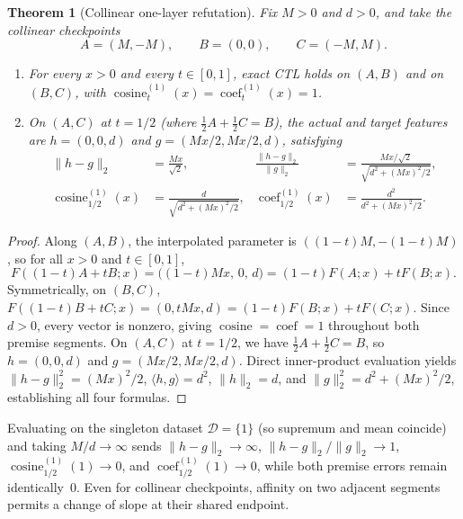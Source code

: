 \documentclass[11pt]{article}
\theoremstyle{plain}
\newtheorem{theorem}{Theorem}
\theoremstyle{definition}
\theoremstyle{remark}
\DeclareMathOperator{\cosine}{cosine}
\DeclareMathOperator{\coef}{coef}
\begin{document}
\begin{theorem}[Collinear one-layer refutation]\label{thm:one-layer}
Fix $M > 0$ and $d > 0$, and take the collinear checkpoints
\[
A = (M, -M), \qquad B = (0, 0), \qquad C = (-M, M).
\]
\begin{enumerate}[label=\textup{(\arabic*)},nosep]
\item For every $x > 0$ and every $t \in [0, 1]$, exact CTL holds on $(A, B)$ and on $(B, C)$, with $\cosine_t^{(1)}(x) = \coef_t^{(1)}(x) = 1$.
\item On $(A, C)$ at $t = 1/2$ (where $\frac{1}{2}A + \frac{1}{2}C = B$), the actual and target features are $h = (0, 0, d)$ and $g = (Mx/2, Mx/2, d)$, satisfying
\begin{align*}
\|h - g\|_2 &= \frac{Mx}{\sqrt{2}}, &
\frac{\|h - g\|_2}{\|g\|_2} &= \frac{Mx/\sqrt{2}}{\sqrt{d^2 + (Mx)^2/2}}, \\
\cosine_{1/2}^{(1)}(x) &= \frac{d}{\sqrt{d^2 + (Mx)^2/2}}, &
\coef_{1/2}^{(1)}(x) &= \frac{d^2}{d^2 + (Mx)^2/2}.
\end{align*}
\end{enumerate}
\end{theorem}

\begin{proof}
Along $(A, B)$, the interpolated parameter is $((1 - t)M, -(1 - t)M)$, so for all $x > 0$ and $t \in [0, 1]$,
\[
F((1 - t)A + tB; x) = \bigl((1 - t)Mx,\, 0,\, d\bigr) = (1 - t)F(A; x) + tF(B; x).
\]
Symmetrically, on $(B, C)$, $F((1 - t)B + tC; x) = (0, tMx, d) = (1 - t)F(B; x) + tF(C; x)$. Since $d > 0$, every vector is nonzero, giving $\cosine = \coef = 1$ throughout both premise segments. On $(A, C)$ at $t = 1/2$, we have $\frac{1}{2}A + \frac{1}{2}C = B$, so $h = (0, 0, d)$ and $g = (Mx/2, Mx/2, d)$. Direct inner-product evaluation yields $\|h - g\|_2^2 = (Mx)^2/2$, $\langle h, g \rangle = d^2$, $\|h\|_2 = d$, and $\|g\|_2^2 = d^2 + (Mx)^2/2$, establishing all four formulas.
\end{proof}

Evaluating on the singleton dataset $\mathcal{D} = \{1\}$ (so supremum and mean coincide) and taking $M/d \to \infty$ sends $\|h - g\|_2 \to \infty$, $\|h - g\|_2/\|g\|_2 \to 1$, $\cosine_{1/2}^{(1)}(1) \to 0$, and $\coef_{1/2}^{(1)}(1) \to 0$, while both premise errors remain identically~$0$. Even for collinear checkpoints, affinity on two adjacent segments permits a change of slope at their shared endpoint.
\end{document}
